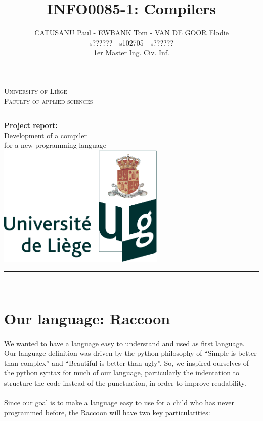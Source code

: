 \documentclass[12pt,a4paper]{article}
\author{CATUSANU Paul - EWBANK Tom - VAN DE GOOR Elodie\\s?????? - s102705 - s??????\\1er Master Ing. Civ. Inf.}
\title{INFO0085-1: Compilers}
\begin{document}
\makeatletter
  \begin{titlepage}
  \centering
      {\large \textsc{University of Liège}}\\
      \textsc{Faculty of applied sciences}\\
      \vspace*{0.5cm}
      \hrule
    \vfill    
    	{\LARGE \textbf{Project report:\\}}
    	{\LARGE Development of a compiler\\ for a new programming language}
    \vfill
      \includegraphics[width=0.6\textwidth]{logo_ulg.png}
     \vfill
      {\large \@title}
    \vfill
    \hrule
        {\large \@author} \\
  \end{titlepage}
\makeatother

\tableofcontents
\newpage

\section{Our language: Raccoon}

\paragraph{}
We wanted to have a language easy to understand and used as first language. Our language definition was driven by the python philosophy of “Simple is better than complex” and “Beautiful is better than ugly”. So, we inspired ourselves of the python syntax for much of our language, particularly the indentation to structure the code instead of the punctuation, in order to improve readability.

\paragraph{}
Since our goal is to make a language easy to use for a child who has never programmed before, the Raccoon will have two key particularities:  
 
\end{document}
